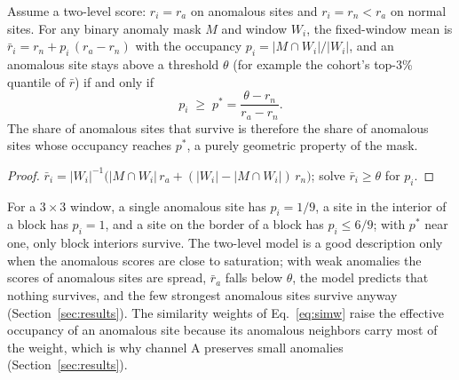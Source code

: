 \begin{proposition}
\label{prop:surv}
Assume a two-level score: $r_i=r_a$ on anomalous sites and $r_i=r_n<r_a$ on normal sites. For any binary anomaly mask $M$ and window $W_i$, the fixed-window mean is $\bar r_i=r_n+p_i\,(r_a-r_n)$ with the occupancy $p_i=|M\cap W_i|/|W_i|$, and an anomalous site stays above a threshold $\theta$ (for example the cohort's top-3\% quantile of $\bar r$) if and only if
\begin{equation}
p_i\;\ge\;p^{*}=\frac{\theta-r_n}{r_a-r_n}.
\label{eq:pstar}
\end{equation}
The share of anomalous sites that survive is therefore the share of anomalous sites whose occupancy reaches $p^{*}$, a purely geometric property of the mask.
\end{proposition}
\begin{proof}
$\bar r_i=|W_i|^{-1}\bigl(|M\cap W_i|\,r_a+(|W_i|-|M\cap W_i|)\,r_n\bigr)$; solve $\bar r_i\ge\theta$ for $p_i$.
\end{proof}
For a $3\times3$ window, a single anomalous site has $p_i=1/9$, a site in the interior of a block has $p_i=1$, and a site on the border of a block has $p_i\le 6/9$; with $p^{*}$ near one, only block interiors survive. The two-level model is a good description only when the anomalous scores are close to saturation; with weak anomalies the scores of anomalous sites are spread, $\bar r_a$ falls below $\theta$, the model predicts that nothing survives, and the few strongest anomalous sites survive anyway (Section~\ref{sec:results}). The similarity weights of Eq.~\eqref{eq:simw} raise the effective occupancy of an anomalous site because its anomalous neighbors carry most of the weight, which is why channel A preserves small anomalies (Section~\ref{sec:results}).

